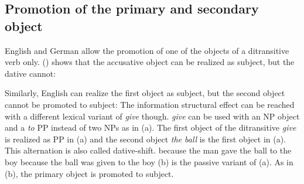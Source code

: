 

\subsection{Promotion of the primary and secondary object}

English and German allow the promotion of one of the objects of a ditransitive verb only. ()
shows that the accusative object can be realized as subject, but the dative cannot:
\eal
{}
\zl

Similarly, English can realize the first object as subject, but the second object cannot be promoted
to subject:
\eal
{}
\zl
The information structural effect can be reached with a different lexical variant of \emph{give}
though. \emph{give} can be used with an NP object and a \emph{to} PP instead of two NPs as in
(a). The first object of the ditransitive \emph{give} is realized as PP in (a) and the
second object \emph{the ball} is the first object in (a). This alternation is also called dative-shift.
\eal
\ex because the man gave the ball to the boy
\ex because the ball was given to the boy
\zl
(b) is the passive variant of (a). As in (b), the primary object is promoted
to subject.

